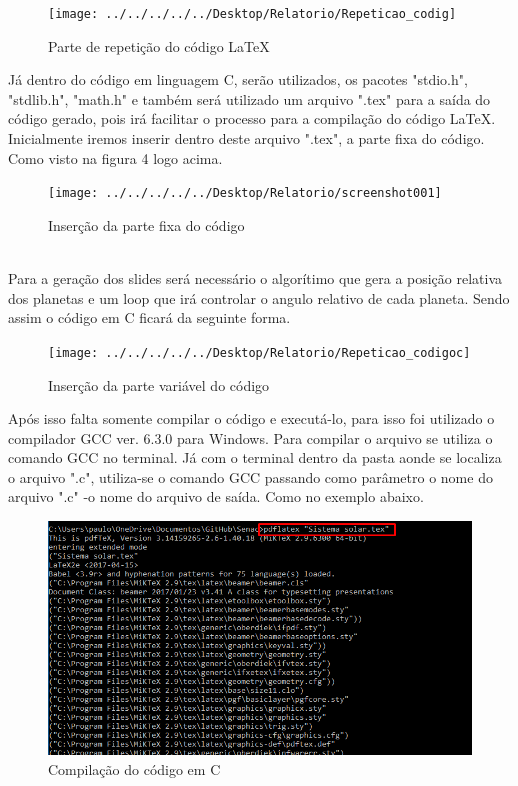 \documentclass[
	12pt,				%
	openright,			%
	oneside,
	a4paper,			%
	english,			%
	french,				%
	spanish,			%
	brazil,				%
	]{abntex2}
\begin{document}
	\begin{figure}[h]
		\centering
		\texttt{[image: ../../../../../Desktop/Relatorio/Repeticao\_codig]}
		\caption{Parte de repetição do código LaTeX}
		\label{fig:Repeticao_codigo}
	\end{figure}
	\indent Já dentro do código em linguagem C, serão utilizados, os pacotes "stdio.h", "stdlib.h", "math.h" e também será utilizado um arquivo ".tex"  para a saída do código gerado, pois irá facilitar o processo para a compilação do código LaTeX. Inicialmente iremos inserir dentro deste arquivo ".tex", a parte fixa do código. Como visto na figura 4 logo acima.
	\begin{figure}[h]
		\centering
		\texttt{[image: ../../../../../Desktop/Relatorio/screenshot001]}
		\caption{Inserção da parte fixa do código}
		\label{fig:screenshot001}
	\end{figure}
	\\ \indent Para a geração dos slides será necessário o algorítimo que gera a posição relativa dos planetas e um loop que irá controlar o angulo relativo de cada planeta. Sendo assim o código em C ficará da seguinte forma. 
	\begin{figure}[h]
		\centering
		\texttt{[image: ../../../../../Desktop/Relatorio/Repeticao\_codigoc]}
		\caption{Inserção da parte variável do código}
		\label{fig:Repeticao_codigoc}
	\end{figure}
	 \indent Após isso falta somente compilar o código e executá-lo, para isso foi utilizado o compilador GCC ver. 6.3.0 para Windows. Para compilar o arquivo se utiliza o comando GCC no terminal. Já com o terminal dentro da pasta aonde se localiza o arquivo ".c", utiliza-se o comando GCC passando como parâmetro o nome do arquivo ".c" -o nome do arquivo de saída. Como no exemplo abaixo.
	\begin{figure}[h]
		\centering
		\includegraphics[width=0.7\linewidth]{screenshot002}
		\caption{Compilação do código em C}
		\label{fig:screenshot002}
	\end{figure}
	
\end{document}
